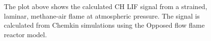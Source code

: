 \begin{figure}

\centering



\caption[Strained flames]{The plot above shows the calculated CH LIF signal from a strained, laminar, methane-air flame at atmospheric pressure. The signal is calculated from Chemkin simulations using the Opposed flow flame reactor model.}

\label{fig:strain}

\end{figure}
